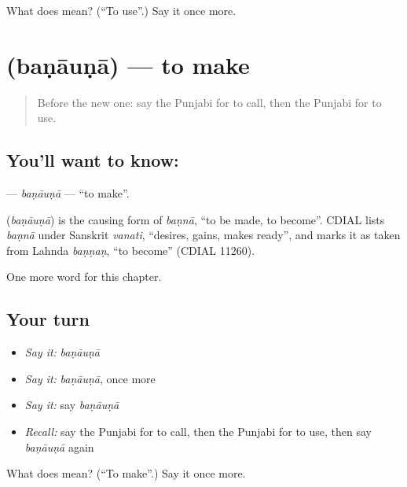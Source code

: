 \begin{tcolorbox}[breakable,colback=teal!4,colframe=teal!35!black,title={Before you move on}]
What does  mean? (\textquotedblleft{}To use\textquotedblright{}.) Say it once more.
\end{tcolorbox}
\section[\texorpdfstring{\pa{ਬਣਾਉਣਾ} (baṇāuṇā)}{ਬਣਾਉਣਾ (baṇāuṇā)}]{ (baṇāuṇā) — to make}

\label{lesson:PA-C149-banauna}



\begin{quote}
Before the new one: say the Punjabi for to call, then the Punjabi for to use.
\end{quote}

\subsection*{You'll want to know: }
\textbf{} — \emph{baṇāuṇā} — \textquotedblleft{}to make\textquotedblright{}.

\begin{cousinweb}
\textbf{} (\emph{baṇāuṇā}) is the causing form of \emph{baṇnā}, \textquotedblleft{}to be made, to become\textquotedblright{}. CDIAL lists \emph{baṇnā} under Sanskrit \emph{vanati}, \textquotedblleft{}desires, gains, makes ready\textquotedblright{}, and marks it as taken from Lahnda \emph{baṇṇaṇ}, \textquotedblleft{}to become\textquotedblright{} (CDIAL 11260).
\end{cousinweb}

\begin{grammarlens}[title={What you've built}]
One more word for this chapter.
\end{grammarlens}

\subsection*{Your turn}
\begin{itemize}
\raggedright
  \item \emph{Say it:} \emph{baṇāuṇā}
  \item \emph{Say it:} \emph{baṇāuṇā}, once more
  \item \emph{Say it:} say \emph{baṇāuṇā}
  \item \emph{Recall:} say the Punjabi for to call, then the Punjabi for to use, then say \emph{baṇāuṇā} again
\end{itemize}

\begin{tcolorbox}[breakable,colback=teal!4,colframe=teal!35!black,title={Before you move on}]
What does  mean? (\textquotedblleft{}To make\textquotedblright{}.) Say it once more.
\end{tcolorbox}
